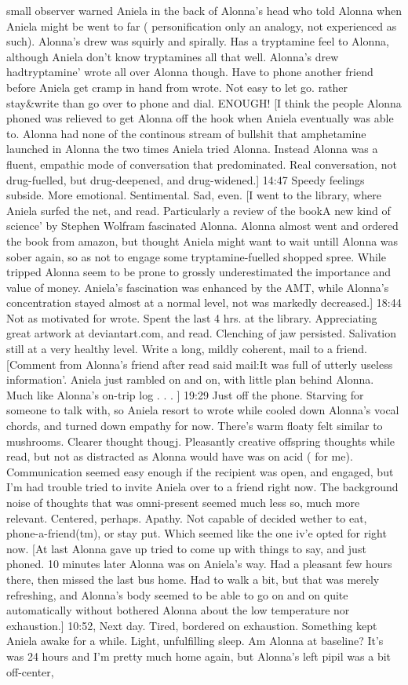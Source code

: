 \documentclass[12pt]{book}
\begin{document}
small observer warned Aniela in the back of Alonna's head who told Alonna when Aniela might be went to far ( personification only an analogy, not experienced as such). Alonna's drew was squirly and spirally. Has a tryptamine feel to Alonna, although Aniela don't know tryptamines all that well. Alonna's drew hadtryptamine' wrote all over Alonna though. Have to phone another friend before Aniela get cramp in hand from wrote. Not easy to let go. rather stay\&write than go over to phone and dial. ENOUGH! [I think the people Alonna phoned was relieved to get Alonna off the hook when Aniela eventually was able to. Alonna had none of the continous stream of bullshit that amphetamine launched in Alonna the two times Aniela tried Alonna. Instead Alonna was a fluent, empathic mode of conversation that predominated. Real conversation, not drug-fuelled, but drug-deepened, and drug-widened.] 14:47 Speedy feelings subside. More emotional. Sentimental. Sad, even. [I went to the library, where Aniela surfed the net, and read. Particularly a review of the bookA new kind of science' by Stephen Wolfram fascinated Alonna. Alonna almost went and ordered the book from amazon, but thought Aniela might want to wait untill Alonna was sober again, so as not to engage some tryptamine-fuelled shopped spree. While tripped Alonna seem to be prone to grossly underestimated the importance and value of money. Aniela's fascination was enhanced by the AMT, while Alonna's concentration stayed almost at a normal level, not was markedly decreased.] 18:44 Not as motivated for wrote. Spent the last 4 hrs. at the library. Appreciating great artwork at deviantart.com, and read. Clenching of jaw persisted. Salivation still at a very healthy level. Write a long, mildly coherent, mail to a friend. [Comment from Alonna's friend after read said mail:It was full of utterly useless information'. Aniela just rambled on and on, with little plan behind Alonna. Much like Alonna's on-trip log . . .  ] 19:29 Just off the phone. Starving for someone to talk with, so Aniela resort to wrote while cooled down Alonna's vocal chords, and turned down empathy for now. There's warm floaty felt similar to mushrooms. Clearer thought thougj. Pleasantly creative offspring thoughts while read, but not as distracted as Alonna would have was on acid ( for me). Communication seemed easy enough if the recipient was open, and engaged, but I'm had trouble tried to invite Aniela over to a friend right now. The background noise of thoughts that was omni-present seemed much less so, much more relevant. Centered, perhaps. Apathy. Not capable of decided wether to eat, phone-a-friend(tm), or stay put. Which seemed like the one iv'e opted for right now. [At last Alonna gave up tried to come up with things to say, and just phoned. 10 minutes later Alonna was on Aniela's way. Had a pleasant few hours there, then missed the last bus home. Had to walk a bit, but that was merely refreshing, and Alonna's body seemed to be able to go on and on quite automatically without bothered Alonna about the low temperature nor exhaustion.] 10:52, Next day. Tired, bordered on exhaustion. Something kept Aniela awake for a while. Light, unfulfilling sleep. Am Alonna at baseline? It's was 24 hours and I'm pretty much home again, but Alonna's left pipil was a bit off-center, 
\end{document}
